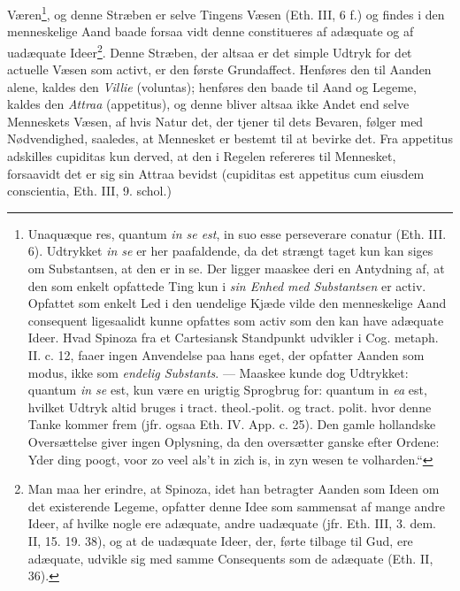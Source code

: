 \documentclass[12pt,a4paper]{book}
\newcommand{\opage}[1]{\marginnote{\footnotesize\textit{[#1]}}}
\begin{document}
Væren\footnote{Unaquæque res, quantum \emph{in se est}, in
suo esse perseverare conatur (Eth. III. 6). Udtrykket \emph{in
se} er her paafaldende, da det strængt taget kun kan siges om
Substantsen, at den er in se. Der ligger maaskee deri en
Antydning af, at den som enkelt opfattede Ting kun i \emph{sin
Enhed med Substantsen} er activ. Opfattet som enkelt Led i
den uendelige Kjæde vilde den menneskelige Aand consequent
ligesaalidt kunne opfattes som activ som den kan have
adæquate Ideer. Hvad Spinoza fra et Cartesiansk Standpunkt
udvikler i Cog. metaph. II. c. 12, faaer ingen Anvendelse paa
hans eget, der opfatter Aanden som modus, ikke som
\emph{endelig Substants}. --- Maaskee kunde dog Udtrykket:
quantum \emph{in se} est, kun være en urigtig Sprogbrug for:
quantum in \emph{ea} est, hvilket Udtryk altid bruges i tract.
theol.-polit. og tract. polit. hvor denne Tanke kommer frem
(jfr. ogsaa Eth. IV. App. c. 25). Den gamle hollandske
Oversættelse giver ingen Oplysning, da den oversætter
ganske efter Ordene: Yder ding poogt, voor zo veel als't in
zich is, in zyn wesen te volharden.“}, og denne Stræben er
selve Tingens Væsen (Eth.
\opage{113} \setcounter{footnote}{0}%
III, 6 f.) og findes i den menneskelige Aand baade forsaa\-%
vidt denne constitueres af adæquate og af uadæquate
Ideer\footnote{Man maa her erindre, at Spinoza, idet han
betragter Aanden som Ideen om det existerende Legeme,
opfatter denne Idee som sammensat af mange andre Ideer, af
hvilke nogle ere adæquate, andre uadæquate
(jfr. Eth. III, 3. dem. II, 15. 19. 38), og at de uadæquate Ideer,
der, førte tilbage til Gud, ere adæquate, udvikle sig med
samme Consequents som de adæquate (Eth. II, 36).}.
Denne Stræben, der altsaa er det simple Udtryk for
det actuelle Væsen som activt, er den første Grundaffect.
Henføres den til Aanden alene, kaldes den
\emph{Villie} (voluntas); henføres den baade til Aand og
Legeme, kaldes den \emph{Attraa} (appetitus), og denne bliver
altsaa ikke Andet end selve Menneskets Væsen, af hvis Natur
det, der tjener til dets Bevaren, følger med Nødvendighed,
saaledes, at Mennesket er bestemt til at bevirke det. Fra
appetitus adskilles cupiditas kun derved, at den i Regelen
refereres til Mennesket, forsaavidt det er sig sin Attraa
bevidst (cupiditas est appetitus cum eiusdem conscientia,
Eth. III, 9. schol.)
\end{document}
